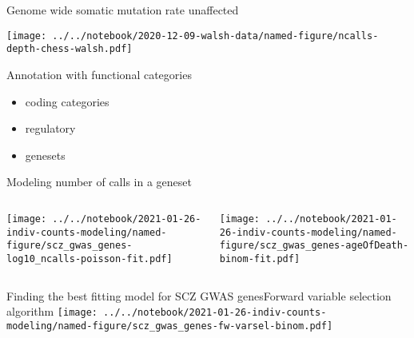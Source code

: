 \documentclass[usenames,dvipsnames]{beamer}
\begin{document}
\begin{frame}{Genome wide somatic mutation rate unaffected}
\begin{center}
\texttt{[image: ../../notebook/2020-12-09-walsh-data/named-figure/ncalls-depth-chess-walsh.pdf]}
\end{center}
\end{frame}

\begin{frame}{Annotation with functional categories}
\begin{itemize}
\item coding categories
\item regulatory
\item genesets
\end{itemize}
\end{frame}

\begin{frame}{Modeling number of calls in a geneset}
\begin{columns}[t]
\begin{column}{0.5\textwidth}

\texttt{[image: ../../notebook/2021-01-26-indiv-counts-modeling/named-figure/scz\_gwas\_genes-log10\_ncalls-poisson-fit.pdf]}
\end{column}

\begin{column}{0.5\textwidth}

\texttt{[image: ../../notebook/2021-01-26-indiv-counts-modeling/named-figure/scz\_gwas\_genes-ageOfDeath-binom-fit.pdf]}
\end{column}
\end{columns}
\begin{center}
\end{center}
\end{frame}

\begin{frame}{Finding the best fitting model for SCZ GWAS genes}{Forward variable selection algorithm}
\texttt{[image: ../../notebook/2021-01-26-indiv-counts-modeling/named-figure/scz\_gwas\_genes-fw-varsel-binom.pdf]}
\end{frame}
\end{document}
